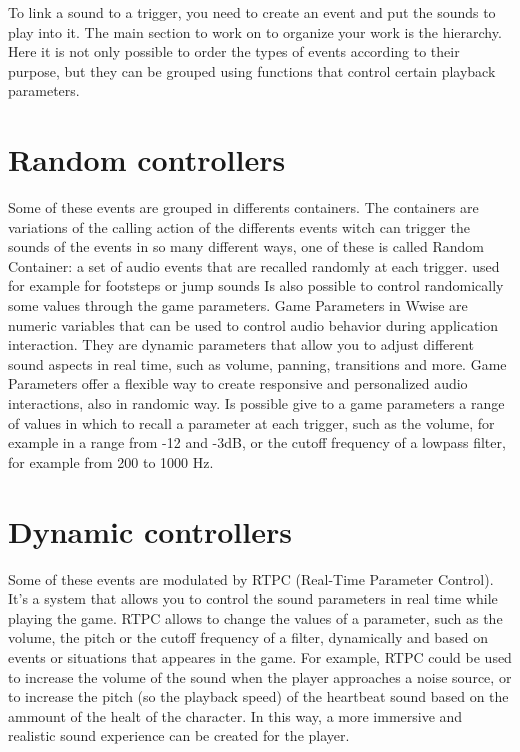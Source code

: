 To link a sound to a trigger, you need to create an event and put the sounds to play into it. The main section to work on to organize your work is the hierarchy. Here it is not only possible to order the types of events according to their purpose, but they can be grouped using functions that control certain playback parameters. 

\section{Random controllers}
Some of these events are grouped in differents containers. The containers are variations of the calling action of the differents events witch can trigger the sounds of the events in so many different ways, one of these is called Random Container: a set of audio events that are recalled randomly at each trigger. used for example for footsteps or jump sounds
Is also possible to control randomically some values through the game parameters.
Game Parameters in Wwise are numeric variables that can be used to control audio behavior during application interaction. They are dynamic parameters that allow you to adjust different sound aspects in real time, such as volume, panning, transitions and more. Game Parameters offer a flexible way to create responsive and personalized audio interactions, also in randomic way. Is possible give to a game parameters a range of values ​​in which to recall a parameter at each trigger, such as the volume, for example in a range from -12 and -3dB, or the cutoff frequency of a lowpass filter, for example from 200 to 1000 Hz.

\section{Dynamic controllers}
Some of these events are modulated by RTPC (Real-Time Parameter Control). It's a system that allows you to control the sound parameters in real time while playing the game.
RTPC allows to change the values ​​of a parameter, such as the volume, the pitch or the cutoff frequency of a filter, dynamically and based on events or situations that appeares in the game. For example, RTPC could be used to increase the volume of the sound when the player approaches a noise source, or to increase the pitch (so the playback speed) of the heartbeat sound based on the ammount of the healt of the character. In this way, a more immersive and realistic sound experience can be created for the player.

